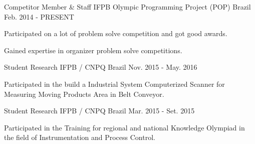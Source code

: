 

\begin{cventries}

 
  \cventry
    {Competitor Member \& Staff} %
    {IFPB Olympic Programming Project (POP)} %
    {Brazil} %
    {Feb. 2014 - PRESENT} %
    {
      \begin{cvitems} %
        \item { Participated on a lot of problem solve competition and got good awards.}
        \item {Gained expertise in organizer problem solve competitions.}
      \end{cvitems}
    }
    
  \cventry
    {Student Research} %
    {IFPB / CNPQ} %
    {Brazil} %
    {Nov. 2015 - May. 2016} %
    {
      \begin{cvitems} %
        \item {Participated in the build a Industrial System Computerized  Scanner for Measuring Moving Products Area in Belt Conveyor.}
      \end{cvitems}
    }
    
 \cventry
    {Student Research} %
    {IFPB / CNPQ} %
    {Brazil} %
    {Mar. 2015 - Set. 2015} %
    {
      \begin{cvitems} %
        \item {Participated in the Training for regional and national Knowledge Olympiad in the field of Instrumentation and Process Control.}
      \end{cvitems}
    }



\end{cventries}
